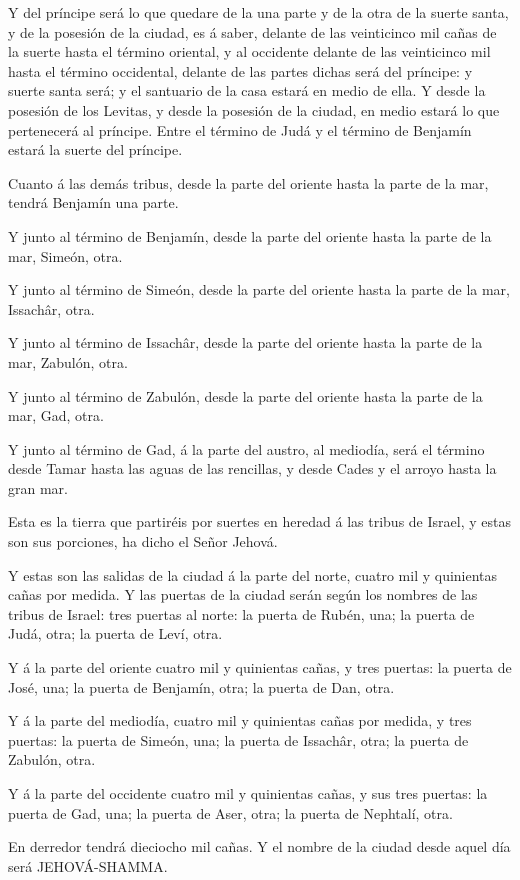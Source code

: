  Y del príncipe será lo que quedare de la una parte y de la
otra de la suerte santa, y de la posesión de la ciudad, es á saber,
delante de las veinticinco mil cañas de la suerte hasta el término
oriental, y al occidente delante de las veinticinco mil hasta el término
occidental, delante de las partes dichas será del príncipe: y suerte
santa será; y el santuario de la casa estará en medio de ella.
 Y desde la posesión de los Levitas, y desde la posesión de
la ciudad, en medio estará lo que pertenecerá al príncipe. Entre el
término de Judá y el término de Benjamín estará la suerte del príncipe.

 Cuanto á las demás tribus, desde la parte del oriente
hasta la parte de la mar, tendrá Benjamín una parte.

 Y junto al término de Benjamín, desde la parte del oriente
hasta la parte de la mar, Simeón, otra.

 Y junto al término de Simeón, desde la parte del oriente
hasta la parte de la mar, Issachâr, otra.

 Y junto al término de Issachâr, desde la parte del oriente
hasta la parte de la mar, Zabulón, otra.

 Y junto al término de Zabulón, desde la parte del oriente
hasta la parte de la mar, Gad, otra.

 Y junto al término de Gad, á la parte del austro, al
mediodía, será el término desde Tamar hasta las aguas de las rencillas,
y desde Cades y el arroyo hasta la gran mar.

 Esta es la tierra que partiréis por suertes en heredad á
las tribus de Israel, y estas son sus porciones, ha dicho el Señor
Jehová.

 Y estas son las salidas de la ciudad á la parte del norte,
cuatro mil y quinientas cañas por medida.  Y las puertas de
la ciudad serán según los nombres de las tribus de Israel: tres puertas
al norte: la puerta de Rubén, una; la puerta de Judá, otra; la puerta de
Leví, otra.

 Y á la parte del oriente cuatro mil y quinientas cañas, y
tres puertas: la puerta de José, una; la puerta de Benjamín, otra; la
puerta de Dan, otra.

 Y á la parte del mediodía, cuatro mil y quinientas cañas
por medida, y tres puertas: la puerta de Simeón, una; la puerta de
Issachâr, otra; la puerta de Zabulón, otra.

 Y á la parte del occidente cuatro mil y quinientas cañas,
y sus tres puertas: la puerta de Gad, una; la puerta de Aser, otra; la
puerta de Nephtalí, otra.

 En derredor tendrá dieciocho mil cañas. Y el nombre de la
ciudad desde aquel día será JEHOVÁ-SHAMMA.
